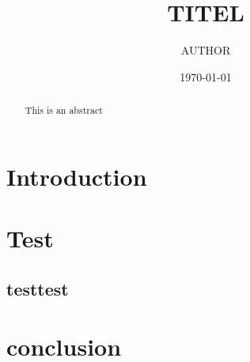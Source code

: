 \documentclass[nobib]{tufte-handout}
\title{TITEL}
\author{AUTHOR}
\date{\today}
\begin{document}
\maketitle

\begin{abstract}
This is an abstract
\end{abstract}

\section{Introduction}
\section{Test}
\subsection{testtest}
\section{conclusion}
\end{document}
